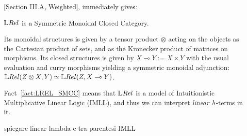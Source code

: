 [Section III.A, Weighted], immediately gives:

\begin{fact}\label{fact:LREL_SMCC}
 $\LREL$ is a Symmetric Monoidal Closed Category.
\end{fact}

Its monoidal structures is given by a tensor product $\otimes$ acting on the objects as the Cartesian product of sets, and as the Kronecker product of matrices on morphisms.
Its closed structures is given by $X\multimap Y:=X\times Y$ with the usual evaluation and curry morphisms yielding a symmetric monoidal adjunction: $\LREL(Z\otimes X, Y) \simeq \LREL (Z, X\multimap Y)$.

Fact~\ref{fact:LREL_SMCC} means that $\LREL$ is a model of Intuitionistic Multiplicative Linear Logic (IMLL), and thus we can interpret \emph{linear} $\lambda$-terms in it.

 {\color{red}spiegare linear lambda e tra parentesi IMLL}
